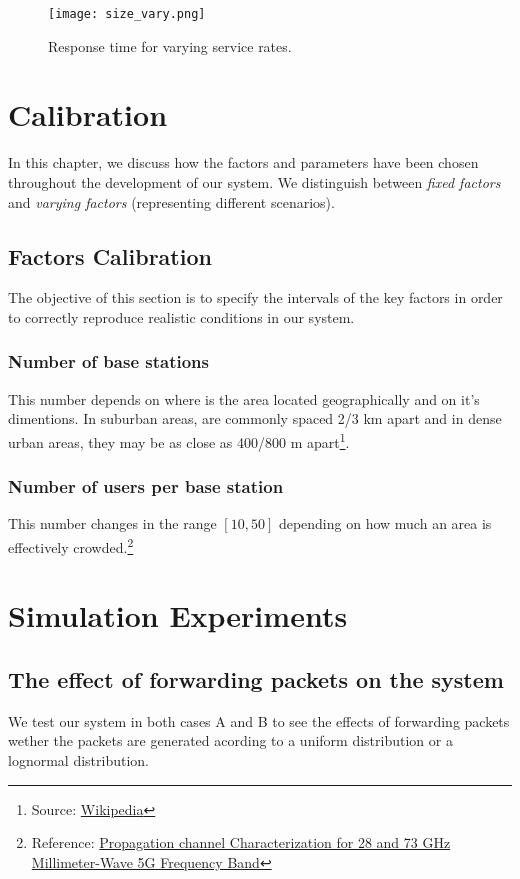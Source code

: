 \documentclass{report}
\begin{document}
\begin{figure}[H]
    \centering
    \texttt{[image: size\_vary.png]}
    \caption{Response time for varying service rates.}
\end{figure}

\chapter{Calibration}
In this chapter, we discuss how the factors and parameters have been chosen throughout the development of our system. We distinguish between \textit{fixed factors} and \textit{varying factors} (representing different scenarios).

\section{Factors Calibration}
The objective of this section is to specify the intervals of the key factors in order to correctly reproduce realistic conditions in our system.

\subsection{Number of base stations}
This number depends on where is the area located geographically and on it's dimentions.
In suburban areas, are commonly spaced 2/3 km apart and in dense urban areas, they may be as close as 400/800 m apart\footnote{Source: \href{https://en.wikipedia.org/wiki/Cell_site}{Wikipedia}}.

\subsection{Number of users per base station}
This number changes in the range $[10, 50]$ depending on how much an area is effectively crowded.\footnote{Reference: \href{https://ieeexplore.ieee.org/document/8305375}{Propagation channel Characterization for 28 and 73 GHz Millimeter-Wave 5G Frequency Band}}

\chapter{Simulation Experiments}
\section{The effect of forwarding packets on the system}
We test our system in both cases A and B to see the effects of forwarding packets wether the packets are generated acording to a uniform distribution or a lognormal distribution.
\end{document}
